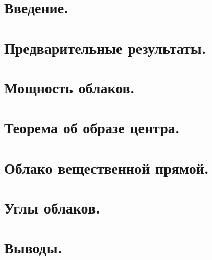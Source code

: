 \documentclass[a4paper]{article}
\begin{document}

\newpage
\tableofcontents
\newpage
\pagestyle{plain}
\setcounter{page}{1}
\section{Введение.}

\section{Предварительные результаты.}

\section{Мощность облаков.}

\section{Теорема об образе центра.}

\section{Облако вещественной прямой.}

\section{Углы облаков.}

\section{Выводы.}

\newpage
\renewcommand{\emph}{\em}
\printbibliography
\end{document}
